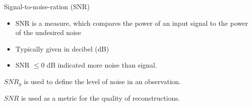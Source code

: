 \begin{frame}{Signal-to-noise-ration (SNR)}
    \pause
    \begin{itemize}
        \item SNR is a measure, which compares the power of an input signal to the power of the undesired noise
        \item Typically given in decibel (dB)
        \item SNR $\le 0$ dB indicated more noise than signal. 
    \end{itemize}


    \begin{tcolorbox}[colback=red!5!white,hide=<1-2>, alert=<3>, colframe=red!75!black]
        $SNR_y$ is used to define the level of noise in an observation.
    \end{tcolorbox}

        
    \begin{tcolorbox}[colback=red!5!white,hide=<1-3>, alert=<4>, colframe=red!75!black]
        $SNR$ is used as a metric for the quality of reconstructions.
    \end{tcolorbox}

\end{frame}



